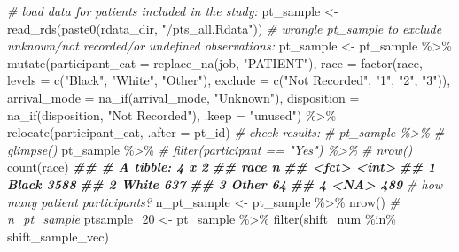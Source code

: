 \documentclass[
]{article}
\newenvironment{Shaded}{\begin{snugshade}}{\end{snugshade}}
\newcommand{\AttributeTok}[1]{\textcolor[rgb]{0.77,0.63,0.00}{#1}}
\newcommand{\CommentTok}[1]{\textcolor[rgb]{0.56,0.35,0.01}{\textit{#1}}}
\newcommand{\DocumentationTok}[1]{\textcolor[rgb]{0.56,0.35,0.01}{\textbf{\textit{#1}}}}
\newcommand{\FunctionTok}[1]{\textcolor[rgb]{0.00,0.00,0.00}{#1}}
\newcommand{\NormalTok}[1]{#1}
\newcommand{\OtherTok}[1]{\textcolor[rgb]{0.56,0.35,0.01}{#1}}
\newcommand{\SpecialCharTok}[1]{\textcolor[rgb]{0.00,0.00,0.00}{#1}}
\newcommand{\StringTok}[1]{\textcolor[rgb]{0.31,0.60,0.02}{#1}}
\begin{document}
\begin{Shaded}
\begin{Highlighting}[]
\CommentTok{\# load data for patients included in the study:}
\NormalTok{pt\_sample }\OtherTok{\textless{}{-}} \FunctionTok{read\_rds}\NormalTok{(}\FunctionTok{paste0}\NormalTok{(rdata\_dir, }\StringTok{"/pts\_all.Rdata"}\NormalTok{))}
\CommentTok{\# wrangle pt\_sample to exclude unknown/not recorded/or undefined observations:}
\NormalTok{pt\_sample }\OtherTok{\textless{}{-}}\NormalTok{ pt\_sample }\SpecialCharTok{\%\textgreater{}\%}
  \FunctionTok{mutate}\NormalTok{(}\AttributeTok{participant\_cat =} \FunctionTok{replace\_na}\NormalTok{(job, }\StringTok{"PATIENT"}\NormalTok{), }
         \AttributeTok{race =} \FunctionTok{factor}\NormalTok{(race,}
              \AttributeTok{levels =} \FunctionTok{c}\NormalTok{(}\StringTok{"Black"}\NormalTok{,}
                         \StringTok{"White"}\NormalTok{,}
                         \StringTok{"Other"}\NormalTok{),}
              \AttributeTok{exclude =} \FunctionTok{c}\NormalTok{(}\StringTok{"Not Recorded"}\NormalTok{, }\StringTok{"1"}\NormalTok{, }\StringTok{"2"}\NormalTok{, }\StringTok{"3"}\NormalTok{)),}
         \AttributeTok{arrival\_mode =} \FunctionTok{na\_if}\NormalTok{(arrival\_mode, }\StringTok{"Unknown"}\NormalTok{),}
         \AttributeTok{disposition =} \FunctionTok{na\_if}\NormalTok{(disposition, }\StringTok{"Not Recorded"}\NormalTok{),}
         \AttributeTok{.keep =} \StringTok{"unused"}\NormalTok{) }\SpecialCharTok{\%\textgreater{}\%}
  \FunctionTok{relocate}\NormalTok{(participant\_cat, }\AttributeTok{.after =}\NormalTok{ pt\_id)}
\CommentTok{\# check results:}
\CommentTok{\# pt\_sample \%\textgreater{}\% }
\CommentTok{\#   glimpse()}
\NormalTok{pt\_sample }\SpecialCharTok{\%\textgreater{}\%}
  \CommentTok{\# filter(participant == "Yes") \%\textgreater{}\%}
  \CommentTok{\# nrow()}
  \FunctionTok{count}\NormalTok{(race)}
\DocumentationTok{\#\# \# A tibble: 4 x 2}
\DocumentationTok{\#\#   race      n}
\DocumentationTok{\#\#   \textless{}fct\textgreater{} \textless{}int\textgreater{}}
\DocumentationTok{\#\# 1 Black  3588}
\DocumentationTok{\#\# 2 White   637}
\DocumentationTok{\#\# 3 Other    64}
\DocumentationTok{\#\# 4 \textless{}NA\textgreater{}    489}
\CommentTok{\# how many patient participants?}
\NormalTok{n\_pt\_sample }\OtherTok{\textless{}{-}}\NormalTok{ pt\_sample }\SpecialCharTok{\%\textgreater{}\%}
  \FunctionTok{nrow}\NormalTok{()}
\CommentTok{\# n\_pt\_sample}
\NormalTok{ptsample\_20 }\OtherTok{\textless{}{-}}\NormalTok{   pt\_sample }\SpecialCharTok{\%\textgreater{}\%}
  \FunctionTok{filter}\NormalTok{(shift\_num }\SpecialCharTok{\%in\%}\NormalTok{ shift\_sample\_vec)}


\end{Highlighting}
\end{Shaded}
\end{document}
